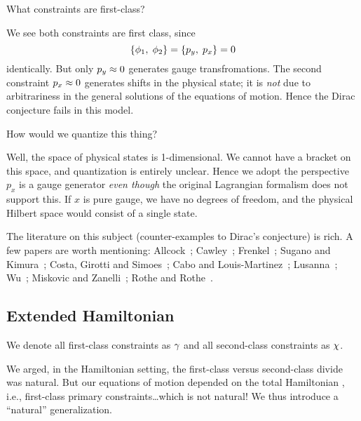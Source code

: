  What constraints are first-class?

\begin{soln}
We see both constraints are first class, since
\begin{equation}
\left\{\phi_{1},\;\phi_{2}\right\}=\left\{p_{y},\;p_{x}\right\}=0
\end{equation}
identically. But only $p_{y}\approx0$ generates gauge
transfromations. The second constraint $p_{x}\approx0$ generates shifts
in the physical state; it is \emph{not} due to arbitrariness in the
general solutions of the equations of motion. Hence the Dirac conjecture
fails in this model.
\end{soln}

 How would we quantize this thing?

\begin{soln}
Well, the space of physical states is 1-dimensional. We cannot have a
bracket on this space, and quantization is entirely unclear. Hence we
adopt the perspective $p_{x}$ is a gauge generator \emph{even though}
the original Lagrangian formalism does not support this. If $x$ is pure
gauge, we have no degrees of freedom, and the physical Hilbert space
would consist of a single state.
\end{soln}

The literature on this subject (counter-examples to Dirac's conjecture)
is rich. A few papers are worth mentioning: Allcock~\cite{allcock1975};
Cawley~\cite{PhysRevLett.42.413}; Frenkel~\cite{Frenkel:1980nt};
Sugano and Kimura~\cite{Sugano:1982sy}; Costa, Girotti and 
Simoes~\cite{Costa:1985tt}; Cabo and Louis-Martinez~\cite{Cabo:1990jk};
Lusanna~\cite{Lusanna:1991je,Lusanna:1991im};
Wu~\cite{Wu:1994jd}; Miskovic and Zanelli~\cite{Miskovic:2003ex};
Rothe and Rothe~\cite{Rothe:2004jc}.

\subsection{Extended Hamiltonian}

 We denote all first-class constraints as
$\gamma$ and all second-class constraints as
$\chi$.

\M
We arged, in the Hamiltonian setting, the first-class versus
second-class divide was natural. But our equations of motion depended on
the total Hamiltonian , i.e., first-class primary
constraints\dots which is not natural! We thus introduce a ``natural''
generalization. 

